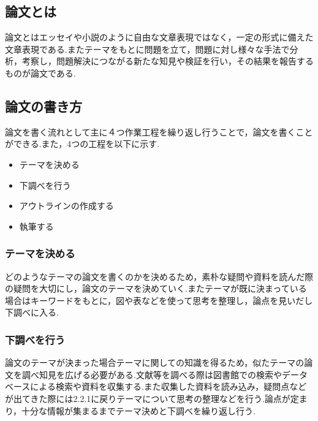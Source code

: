 \documentclass[a4j,12pt]{jarticle}
\begin{document}
\subsection{論文とは}
論文とはエッセイや小説のように自由な文章表現ではなく，一定の形式に備えた文章表現である.またテーマをもとに問題を立て，問題に対し様々な手法で分析，考察し，問題解決につながる新たな知見や検証を行い，その結果を報告するものが論文である\cite{ren1}.

\subsection{論文の書き方}
論文を書く流れとして主に４つ作業工程を繰り返し行うことで，論文を書くことができる.また，4つの工程を以下に示す.
\begin{itemize}
  \item テーマを決める
  \item 下調べを行う
  \item アウトラインの作成する
  \item 執筆する
\end{itemize}
\subsubsection{テーマを決める}
どのようなテーマの論文を書くのかを決めるため，素朴な疑問や資料を読んだ際の疑問を大切にし，論文のテーマを決めていく.またテーマが既に決まっている場合はキーワードをもとに，図や表などを使って思考を整理し，論点を見いだし下調べに入る.

\subsubsection{下調べを行う}
論文のテーマが決まった場合テーマに関しての知識を得るため，似たテーマの論文を調べ知見を広げる必要がある.文献等を調べる際は図書館での検索やデータベースによる検索や資料を収集する.また収集した資料を読み込み，疑問点などが出てきた際には2.2.1に戻りテーマについて思考の整理などを行う.論点が定まり，十分な情報が集まるまでテーマ決めと下調べを繰り返し行う.
\end{document}
